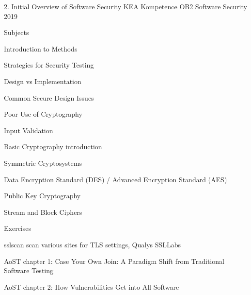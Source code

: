 \documentclass[Screen16to9,17pt]{foils}
\begin{document}
\mytitlepage
{2. Initial Overview of Software Security}
{KEA Kompetence OB2 Software Security 2019}


\begin{list1}
\item Subjects
\begin{list2}
\item Introduction to Methods
\item Strategies for Security Testing
\item Design vs Implementation
\item Common  Secure Design Issues
\item Poor Use of Cryptography
\item Input Validation
\item Basic Cryptography introduction
\item Symmetric Cryptosystems
\item Data Encryption Standard (DES) / Advanced Encryption Standard (AES)
\item Public Key Cryptography
\item Stream and Block Ciphers
\end{list2}
\item Exercises
\begin{list2}
\item sslscan scan various sites for TLS settings, Qualys SSLLabs
\end{list2}
\end{list1}


\begin{list1}
\item AoST chapter 1: Case Your Own Join: A Paradigm Shift from Traditional Software Testing
\item AoST chapter 2: How Vulnerabilities Get into All Software
\end{list1}



\begin{list1}
\item
\end{list1}





\end{document}
